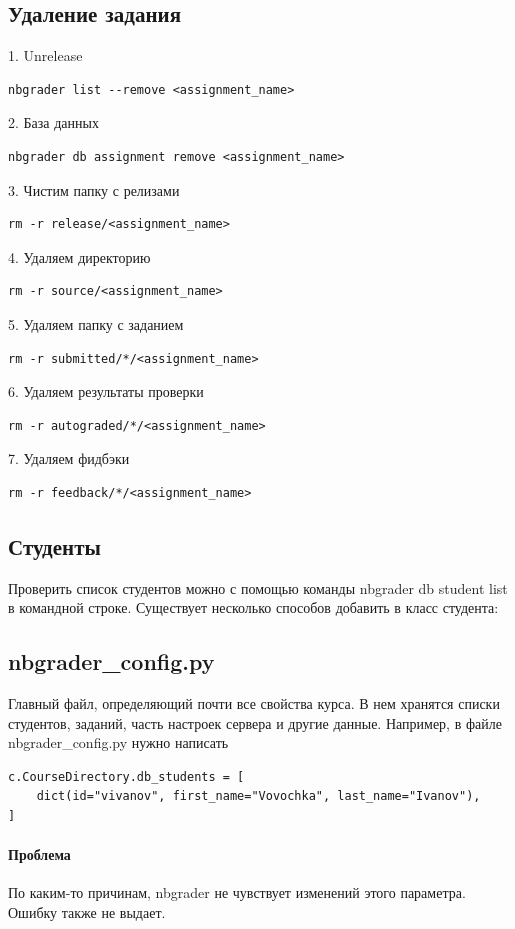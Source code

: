 \documentclass[a4paper,12pt]{article}
\begin{document}
\subsection{Удаление задания}
1. Unrelease 
\begin{verbatim}
nbgrader list --remove <assignment_name>
\end{verbatim}
2. База данных 
\begin{verbatim}
nbgrader db assignment remove <assignment_name>
\end{verbatim}
3. Чистим папку с релизами
\begin{verbatim}
rm -r release/<assignment_name>
\end{verbatim}
4. Удаляем директорию 
\begin{verbatim}
rm -r source/<assignment_name>
\end{verbatim}
5. Удаляем папку с заданием
\begin{verbatim}
rm -r submitted/*/<assignment_name>
\end{verbatim}
6. Удаляем результаты проверки
\begin{verbatim}
rm -r autograded/*/<assignment_name>
\end{verbatim}
7. Удаляем фидбэки
\begin{verbatim}
rm -r feedback/*/<assignment_name>
\end{verbatim}
\subsection{Студенты}

Проверить список студентов можно с помощью команды  nbgrader db student list в командной строке.
Существует несколько способов добавить в класс студента:
\subsection{nbgrader\_config.py}
Главный файл, определяющий почти все свойства курса. В нем хранятся списки студентов, заданий, часть настроек сервера и другие данные.
Например, в файле nbgrader\_config.py нужно написать
\begin{verbatim}
c.CourseDirectory.db_students = [
    dict(id="vivanov", first_name="Vovochka", last_name="Ivanov"),
]
\end{verbatim}
\paragraph{Проблема}По каким-то причинам, nbgrader не чувствует изменений этого параметра. Ошибку также не выдает.
\end{document}
